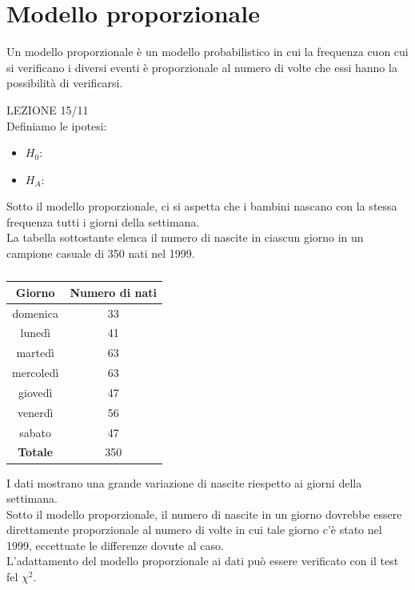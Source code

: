 \documentclass[10pt, draft]{book}
\newcounter{example}[section]
\begin{document}
\section{Modello proporzionale}

Un modello proporzionale è un modello probabilistico in cui la frequenza cuon cui si verificano i diversi eventi è proporzionale al numero di volte che essi hanno la possibilità di verificarsi.

\begin{example}
LEZIONE 15/11
    \\
    Definiamo le ipotesi:
    \begin{itemize}
    \item $H_0$:
    \item $H_A$:
    \end{itemize}
\end{example}

\begin{example}
    Sotto il modello proporzionale, ci si aspetta che i bambini nascano con la stessa frequenza tutti i giorni della settimana.
    \\
    La tabella sottostante elenca il numero di nascite in ciascun giorno in un campione casuale di 350 nati nel 1999.
    \begin{table}[H]
        \centering
        \renewcommand\arraystretch{1.2}
        \begin{tabular}{c|c}
        \hline
        \textbf{Giorno} & \textbf{Numero di nati} \\
        \hline
        domenica & 33 \\
        lunedì & 41 \\
        martedì & 63 \\
        mercoledì & 63 \\
        giovedì & 47 \\
        venerdì & 56 \\
        sabato & 47 \\
        \hline
        \textbf{Totale} & 350 \\
        \hline
        \end{tabular}
        \caption{}
        \label{}
    \end{table}\noindent
    I dati mostrano una grande variazione di nascite riespetto ai giorni della settimana.
    \\
    Sotto il modello proporzionale, il numero di nascite in un giorno dovrebbe essere direttamente proporzionale al numero di volte in cui tale giorno c'è stato nel 1999, eccettuate le differenze dovute al caso.
    \\
    L'adattamento del modello proporzionale ai dati può essere verificato con il test fel $\chi^2$.
\end{example}
\end{document}
